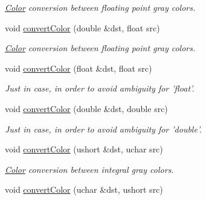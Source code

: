 \begin{DoxyCompactItemize}
\begin{DoxyCompactList}\small\item\em \hyperlink{class_d_o_1_1_color}{Color} conversion between floating point gray colors. \end{DoxyCompactList}\item 
\hypertarget{group___color_conversion_ga4ac1dc80a53cbb26dc57f3e1899a687d}{void \hyperlink{group___color_conversion_ga4ac1dc80a53cbb26dc57f3e1899a687d}{convert\-Color} (double \&dst, float src)}\label{group___color_conversion_ga4ac1dc80a53cbb26dc57f3e1899a687d}

\begin{DoxyCompactList}\small\item\em \hyperlink{class_d_o_1_1_color}{Color} conversion between floating point gray colors. \end{DoxyCompactList}\item 
\hypertarget{group___color_conversion_ga83911520fb12e3f55813ff25458da026}{void \hyperlink{group___color_conversion_ga83911520fb12e3f55813ff25458da026}{convert\-Color} (float \&dst, float src)}\label{group___color_conversion_ga83911520fb12e3f55813ff25458da026}

\begin{DoxyCompactList}\small\item\em Just in case, in order to avoid ambiguity for 'float'. \end{DoxyCompactList}\item 
\hypertarget{group___color_conversion_gae5fae4dc30516ef8840615deb731cc69}{void \hyperlink{group___color_conversion_gae5fae4dc30516ef8840615deb731cc69}{convert\-Color} (double \&dst, double src)}\label{group___color_conversion_gae5fae4dc30516ef8840615deb731cc69}

\begin{DoxyCompactList}\small\item\em Just in case, in order to avoid ambiguity for 'double'. \end{DoxyCompactList}\item 
\hypertarget{group___color_conversion_gafb6cc749eb721f9ad19b66d97e8213d1}{void \hyperlink{group___color_conversion_gafb6cc749eb721f9ad19b66d97e8213d1}{convert\-Color} (ushort \&dst, uchar src)}\label{group___color_conversion_gafb6cc749eb721f9ad19b66d97e8213d1}

\begin{DoxyCompactList}\small\item\em \hyperlink{class_d_o_1_1_color}{Color} conversion between integral gray colors. \end{DoxyCompactList}\item 
\hypertarget{group___color_conversion_ga04b1ae827a5c4e892f6a2eb11e851e37}{void \hyperlink{group___color_conversion_ga04b1ae827a5c4e892f6a2eb11e851e37}{convert\-Color} (uchar \&dst, ushort src)}\label{group___color_conversion_ga04b1ae827a5c4e892f6a2eb11e851e37}


\end{DoxyCompactItemize}
